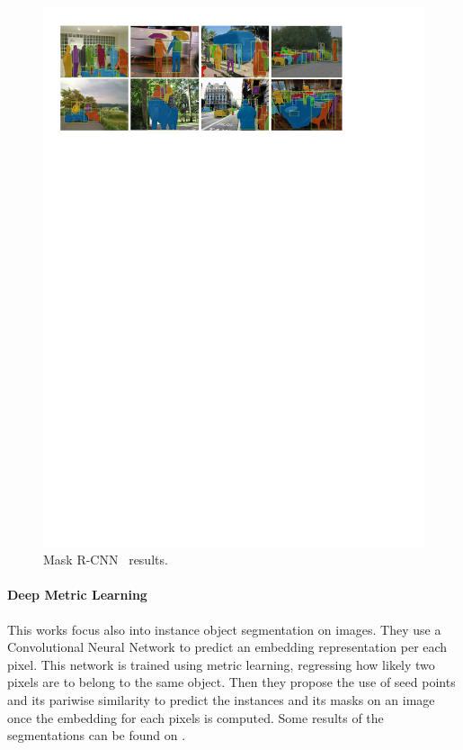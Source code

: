 \begin{figure}[h]
  \centering
  \includegraphics[width=1.\linewidth]{figures/maskrcnn/results.pdf}
  \caption{Mask R-CNN~\cite{he2017mask} results. }
  \label{fig:maskrcnn}
\end{figure}

\paragraph{Deep Metric Learning~\cite{fathi2017semantic}}
This works focus also into instance object segmentation on images.
They use a Convolutional Neural Network to predict an embedding representation per each pixel.
This network is trained using metric learning, regressing how likely two pixels are to belong to the same object.
Then they propose the use of seed points and its pariwise similarity to predict the instances and its masks on an image once the embedding for each pixels is computed.
Some results of the segmentations can be found on .


